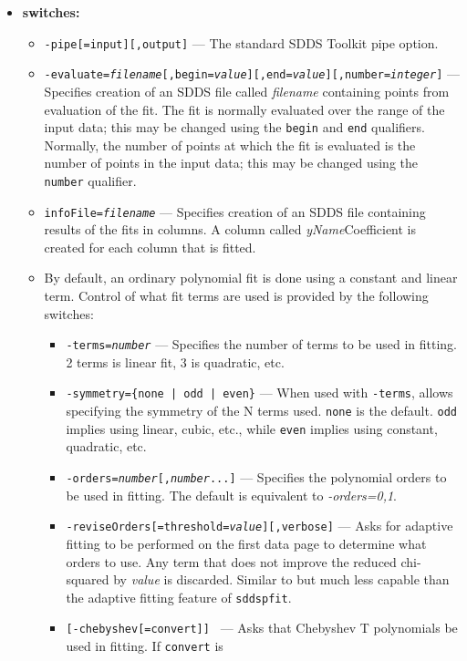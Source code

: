 \begin{itemize}
\item {\bf switches:}
    \begin{itemize}
    \item {\tt -pipe[=input][,output]} --- The standard SDDS Toolkit pipe option.
    \item {\tt -evaluate={\em filename}[,begin={\em value}][,end={\em value}][,number={\em integer}]} ---
        Specifies creation of an SDDS file called {\em filename} containing points from evaluation of the
        fit.  The fit is normally evaluated over the range of the input data; this may be changed using
        the {\tt begin} and {\tt end} qualifiers.  Normally, the number of points at which the fit is
        evaluated is the number of points in the input data; this may be changed using the {\tt number}
        qualifier.
    \item {\tt infoFile={\em filename}} --- Specifies creation of an SDDS file containing results of
        the fits in columns.  A column called {\em yName}Coefficient is created for each column
        that is fitted.
    \item By default, an ordinary polynomial fit is done using a constant and linear term.  
        Control of what fit terms are used is provided by the following switches:
        \begin{itemize}
        \item {\tt -terms={\em number}} --- Specifies the number of terms to be used in fitting. 2 terms is
         linear fit, 3 is quadratic, etc.
        \item {\tt -symmetry=\{none | odd | even\}} --- When used with {\tt -terms}, allows specifying the
        symmetry of the N terms used.  {\tt none} is the default.  {\tt odd} implies using linear, cubic, etc.,
        while  {\tt even} implies using constant, quadratic, etc.
        \item {\tt -orders={\em number}[,{\em number}...]} --- Specifies the polynomial orders to be used in
        fitting.  The default is equivalent to {\em -orders=0,1}.
        \item {\tt -reviseOrders[=threshold={\em value}][,verbose]} --- Asks for adaptive fitting to
        be performed on the first data page to determine what orders to use.  Any term that does not
        improve the reduced chi-squared by {\em value} is discarded.  Similar to but much less capable
        than the adaptive fitting feature of {\tt sddspfit}.
        \item {\tt [-chebyshev[=convert]] } --- Asks that Chebyshev T polynomials be used in fitting.  If {\tt convert} is

\end{itemize}
\end{itemize}
\end{itemize}
